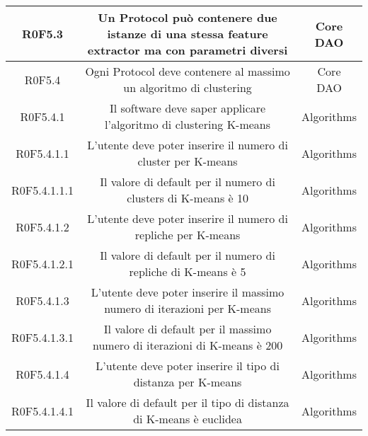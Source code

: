 \begin{center}
\begin{longtable}{|c|c|c|}
\hline
R0F5.3   & \parbox[t]{\larghezza}{Un Protocol può contenere due istanze di una stessa feature extractor ma con parametri diversi}  & \parbox[t]{\dimFonti}{ Core \\ DAO \\} \\
\hline
R0F5.4   & \parbox[t]{\larghezza}{Ogni Protocol deve contenere al massimo un algoritmo di clustering}  & \parbox[t]{\dimFonti}{ Core \\ DAO \\} \\
\hline
R0F5.4.1   & \parbox[t]{\larghezza}{Il software deve saper applicare l'algoritmo di clustering K-means}  & \parbox[t]{\dimFonti}{ Algorithms \\} \\
\hline
R0F5.4.1.1   & \parbox[t]{\larghezza}{L'utente deve poter inserire il numero di cluster per K-means}  & \parbox[t]{\dimFonti}{ Algorithms \\} \\
\hline
R0F5.4.1.1.1   & \parbox[t]{\larghezza}{Il valore di default per il numero di clusters di K-means è 10}  & \parbox[t]{\dimFonti}{ Algorithms \\} \\
\hline
R0F5.4.1.2   & \parbox[t]{\larghezza}{L'utente deve poter inserire il numero di repliche per K-means}  & \parbox[t]{\dimFonti}{ Algorithms \\} \\
\hline
R0F5.4.1.2.1   & \parbox[t]{\larghezza}{Il valore di default per il numero di repliche di K-means\glossario{} è 5}  & \parbox[t]{\dimFonti}{ Algorithms \\} \\
\hline
R0F5.4.1.3   & \parbox[t]{\larghezza}{L'utente deve poter inserire il massimo numero di iterazioni per K-means}  & \parbox[t]{\dimFonti}{ Algorithms \\} \\
\hline
R0F5.4.1.3.1   & \parbox[t]{\larghezza}{Il valore di default per il massimo numero di iterazioni di K-means\glossario{} è 200}  & \parbox[t]{\dimFonti}{ Algorithms \\} \\
\hline
R0F5.4.1.4   & \parbox[t]{\larghezza}{L'utente deve poter inserire il tipo di distanza per K-means}  & \parbox[t]{\dimFonti}{ Algorithms \\} \\
\hline
R0F5.4.1.4.1   & \parbox[t]{\larghezza}{Il valore di default per il tipo di distanza di K-means\glossario{} è euclidea}  & \parbox[t]{\dimFonti}{ Algorithms \\} \\

\end{longtable}
\end{center}
